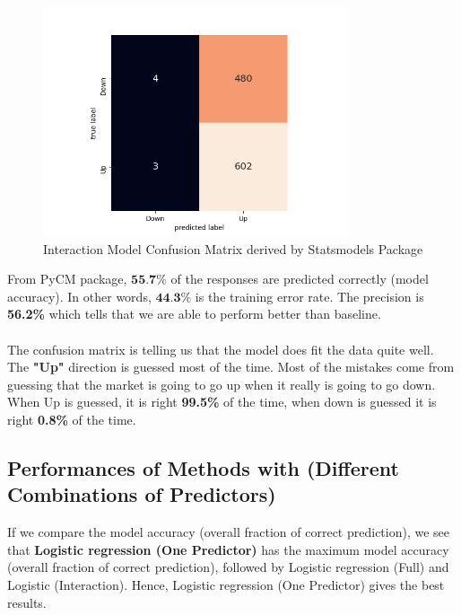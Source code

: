 \documentclass[12pt]{article}
\begin{document}
\begin{figure}[!htbp]
	\centering
	\includegraphics[width=9cm]{intmodel.png}
	\caption{Interaction Model Confusion Matrix derived by Statsmodels Package}
	\label{fig_5}
\end{figure}

From PyCM package, $\textbf{55.7\%}$ of the responses are predicted correctly (model accuracy). In other words, $\textbf{44.3\%}$ is the training error rate. The precision is \textbf{56.2\%} which tells that we are able to perform better than baseline.\\\\
The confusion matrix is telling us that the model does fit the data quite well. The \textbf{"Up"} direction is guessed most of the time. Most of the mistakes come from guessing that the market is going to go up when it really is going to go down. When Up is guessed, it is right \textbf{99.5\%} of the time, when down is guessed it is right \textbf{0.8\%} of the time.

\subsection{Performances of Methods with (Different Combinations of Predictors)}

\begin{table}[h!]
	\centering
\caption{Performances of Methods with (Different Combinations of Predictors)}
\end{table}
If we compare the model accuracy (overall fraction of correct prediction), we see that \textbf{Logistic regression (One Predictor)} has the maximum model accuracy (overall fraction of correct prediction), followed by Logistic regression (Full) and Logistic (Interaction). Hence, Logistic regression (One Predictor) gives the best results.
\end{document}
